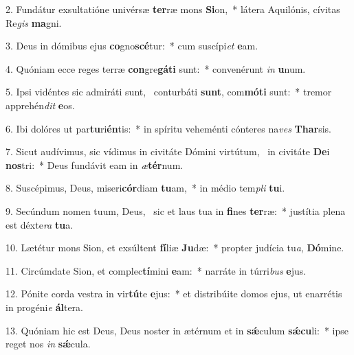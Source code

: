 2. Fundátur exsultatióne univérsæ \textbf{ter}ræ mons \textbf{Si}on,~*  látera Aquilónis, cívitas Re\textit{gis} \textbf{ma}gni.\

3. Deus in dómibus ejus \textbf{co}gno\textbf{scé}tur:~*  cum suscípi\textit{et} \textbf{e}am.\

4. Quóniam ecce reges terræ \textbf{con}gre\textbf{gá}\textbf{ti} sunt:~*  convenérunt \textit{in} \textbf{u}num.\

5. Ipsi vidéntes sic admiráti sunt, \dag\  conturbáti \textbf{sunt}, com\textbf{mó}\textbf{ti} sunt:~*  tremor apprehén\textit{dit} \textbf{e}os.\

6. Ibi dolóres ut par\textbf{tu}ri\textbf{én}tis:~*  in spíritu veheménti cónteres na\textit{ves} \textbf{Thar}sis.\

7. Sicut audívimus, sic vídimus in civitáte Dómini virtútum, \dag\  in civitáte \textbf{De}i \textbf{nos}tri:~*  Deus fundávit eam in \textit{æ}\textbf{tér}num.\

8. Suscépimus, Deus, miseri\textbf{cór}diam \textbf{tu}am,~*  in médio tem\textit{pli} \textbf{tu}i.\

9. Secúndum nomen tuum, Deus, \dag\  sic et laus tua in \textbf{fi}nes \textbf{ter}ræ:~*  justítia plena est déxte\textit{ra} \textbf{tu}a.\

10. Lætétur mons Sion, et exsúltent \textbf{fí}liæ \textbf{Ju}dæ:~*  propter judícia tu\textit{a}, \textbf{Dó}mine.\

11. Circúmdate Sion, et complec\textbf{tí}mini \textbf{e}am:~*  narráte in túrri\textit{bus} \textbf{e}jus.\

12. Pónite corda vestra in vir\textbf{tú}te \textbf{e}jus:~*  et distribúite domos ejus, ut enarrétis in progéni\textit{e} \textbf{ál}tera.\

13. Quóniam hic est Deus, Deus noster in ætérnum et in \textbf{sǽ}culum \textbf{sǽ}\textbf{cu}li:~*  ipse reget nos \textit{in} \textbf{sǽ}cula.\

